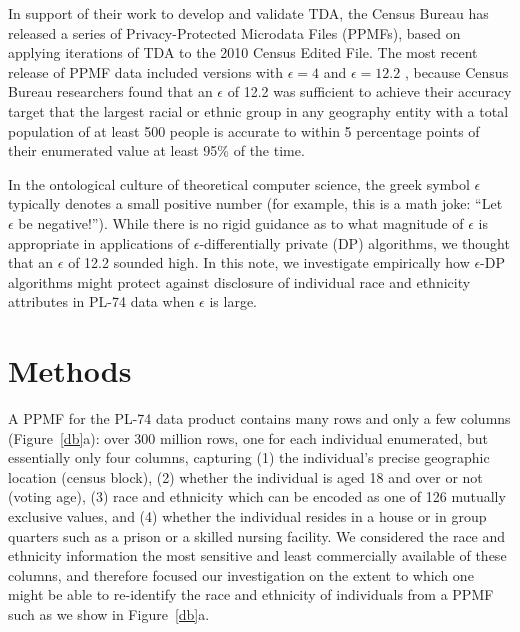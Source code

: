 \documentclass{article}
\begin{document}
In support of their work to develop and validate TDA,  the Census Bureau has released a series of Privacy-Protected Microdata Files (PPMFs), based on applying iterations of TDA to the 2010 Census Edited File.  The most recent release of PPMF data included versions with $\epsilon=4$ and $\epsilon=12.2$ \cite{census2021developing}, because
Census Bureau researchers found that an $\epsilon$ of 12.2 was sufficient to achieve their accuracy target that the largest racial or ethnic group in any geography entity with a total population of at least 500 people is accurate to within 5 percentage points of their enumerated value at least 95\% of the time.

In the ontological culture of theoretical computer science, the greek symbol $\epsilon$ typically denotes a small positive number (for example, this is a math joke: ``Let $\epsilon$ be negative!'').  While there is no rigid guidance as to what magnitude of $\epsilon$ is appropriate in applications of $\epsilon$-differentially private (DP) algorithms, we thought that an $\epsilon$ of 12.2 sounded high. In this note, we investigate empirically how $\epsilon$-DP algorithms might protect against disclosure of individual race and ethnicity attributes in PL-74 data when $\epsilon$ is large.

\section{Methods}
A PPMF for the PL-74 data product contains many rows and only a few columns (Figure~\ref{db}a): over 300 million rows, one for each individual enumerated, but essentially only four columns, capturing (1) the individual's precise geographic location (census block), (2) whether the individual is aged 18 and over or not (voting age), (3) race and ethnicity which can be encoded as one of 126 mutually exclusive values, and (4) whether the individual resides in a house or in group quarters such as a prison or a skilled nursing facility.  We considered the race and ethnicity information the most sensitive and least commercially available of these columns, and therefore focused our investigation on the extent to which one might be able to re-identify the race and ethnicity of individuals from a PPMF such as we show in Figure~\ref{db}a.
\end{document}

